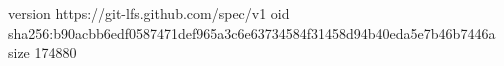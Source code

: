 version https://git-lfs.github.com/spec/v1
oid sha256:b90acbb6edf0587471def965a3c6e63734584f31458d94b40eda5e7b46b7446a
size 174880
